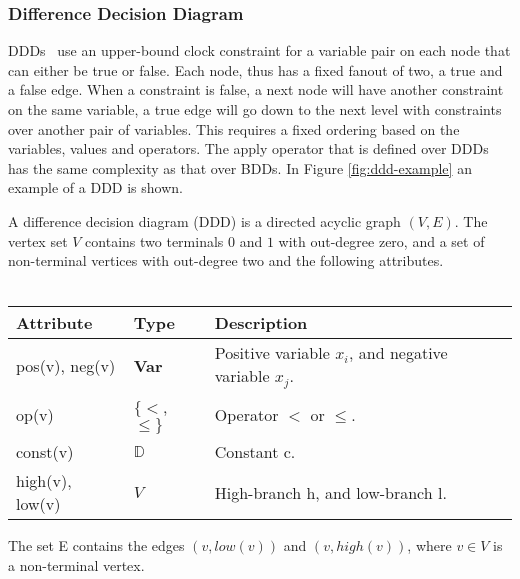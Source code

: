\subsubsection{Difference Decision Diagram}
DDDs~\cite{ddds, ddd-datastructure-99} use an upper-bound clock constraint for a variable pair on each node that can either be true or false. Each node, thus has a fixed fanout of two, a true and a false edge. When a constraint is false, a next node will have another constraint on the same variable, a true edge will go down to the next level with constraints over another pair of variables. This requires a fixed ordering based on the variables, values and operators. The apply operator that is defined over DDDs has the same complexity as that over BDDs. In Figure \ref{fig:ddd-example} an example of a DDD is shown.

\begin{mydef}
\label{def:DDD}
A difference decision diagram (DDD) is a directed acyclic graph $(V,E)$. The vertex set $V$ contains two terminals $0$ and $1$ with out-degree zero, and a set of non-terminal vertices with out-degree two and the following attributes.
\\\\
\begin{tabular}{lll}
Attribute                & Type                      & Description                                           \\\hline
pos(v), neg(v)           & \textbf{Var}              & Positive variable $x_i$, and negative variable $x_j$. \\
op(v)                    & $\{<$, $\leq\}$     & Operator $<$ or $\leq$.                         \\
const(v)                 & $\mathbb{D}$              & Constant c.                                           \\
high(v), low(v)          & $V$                       & High-branch h, and low-branch l.                   
\end{tabular}
The set E contains the edges $(v,low(v))$ and $(v, high(v))$, where $v \in V$ is a non-terminal vertex.
\end{mydef}

